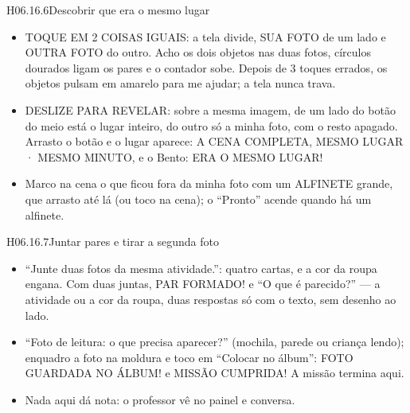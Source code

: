\begin{historia}{H06.16.6}{Descobrir que era o mesmo lugar}{\pronto}
\aceite
\begin{itemize}
  \item TOQUE EM 2 COISAS IGUAIS: a tela divide, SUA FOTO de um lado e OUTRA
    FOTO do outro. Acho os dois objetos nas duas fotos, círculos dourados
    ligam os pares e o contador sobe. Depois de 3 toques errados, os objetos
    pulsam em amarelo para me ajudar; a tela nunca trava.
  \item DESLIZE PARA REVELAR: sobre a mesma imagem, de um lado do botão do
    meio está o lugar inteiro, do outro só a minha foto, com o resto apagado.
    Arrasto o botão e o lugar aparece: A CENA COMPLETA, MESMO LUGAR · MESMO
    MINUTO, e o Bento: ERA O MESMO LUGAR!
  \item Marco na cena o que ficou fora da minha foto com um ALFINETE grande,
    que arrasto até lá (ou toco na cena); o \enquote{Pronto} acende quando
    há um alfinete.
\end{itemize}
\end{historia}

\begin{historia}{H06.16.7}{Juntar pares e tirar a segunda foto}{\pronto}
\aceite
\begin{itemize}
  \item \enquote{Junte duas fotos da mesma atividade.}: quatro cartas, e a
    cor da roupa engana. Com duas juntas, PAR FORMADO! e \enquote{O que é parecido?} --- a atividade
    ou a cor da roupa, duas respostas só com o texto, sem desenho ao lado.
  \item \enquote{Foto de leitura: o que precisa aparecer?} (mochila, parede
    ou criança lendo); enquadro a foto na moldura e toco em
    \enquote{Colocar no álbum}: FOTO GUARDADA NO ÁLBUM! e MISSÃO CUMPRIDA!
    A missão termina aqui.
  \item Nada aqui dá nota: o professor vê no painel e conversa.
\end{itemize}
\end{historia}

